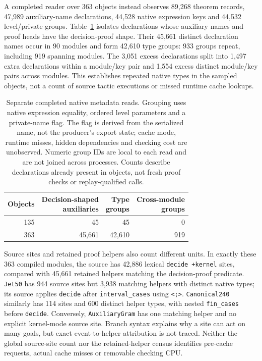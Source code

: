 \documentclass[10pt,twocolumn]{article}
\begin{document}
A completed reader over 363 objects instead observes 89,268 theorem records,
47,989 auxiliary-name declarations, 44,528 native expression keys and 44,532
level/private groups. Table~\ref{tab:native-type-keys} isolates declarations
whose auxiliary names and proof heads have the decision-proof shape.
Their 45,661 distinct declaration names occur in 90 modules and form 42,610
type groups: 933 groups repeat, including 919 spanning modules.
The 3,051 excess declarations split into 1,497 extra declarations within
a module/key pair and 1,554 excess distinct module/key pairs across modules.
This establishes repeated native types in the sampled objects, not a count
of source tactic executions or missed runtime cache lookups.

\begin{table}[t]
\centering
\small
\setlength{\tabcolsep}{4pt}
\begin{tabular}{rrrr}
\toprule
Objects & \shortstack{Decision-shaped\\auxiliaries} &
\shortstack{Type\\groups} & \shortstack{Cross-module\\groups} \\
\midrule
135 & 45 & 45 & 0 \\
363 & 45,661 & 42,610 & 919 \\
\bottomrule
\end{tabular}
\caption{Separate completed native metadata reads. Grouping uses native
expression equality, ordered level parameters and a private-name flag.
The flag is derived from the serialized name, not the producer's export state;
cache mode, runtime misses, hidden dependencies and checking cost are unobserved.
Numeric group IDs are local to each read and are not joined across processes.
Counts describe declarations already present in objects, not fresh proof checks
or replay-qualified calls.}
\label{tab:native-type-keys}
\end{table}

Source sites and retained proof helpers also count different units.
In exactly these 363 compiled modules, the source has 42,886 lexical
\texttt{decide +kernel} sites, compared with 45,661 retained helpers matching
the decision-proof predicate. \texttt{Jet50} has 944 source sites but 3,938
matching helpers with distinct native types; its source applies
\texttt{decide} after \texttt{interval\_cases} using \texttt{<;>}.
\texttt{Canonical240} similarly has 114 sites and 600 distinct helper types,
with nested \texttt{fin\_cases} before \texttt{decide}.
Conversely, \texttt{AuxiliaryGram} has one matching helper and no explicit
kernel-mode source site. Branch syntax explains why a site can act on many
goals, but exact event-to-helper attribution is not traced.
Neither the global source-site count nor the retained-helper census
identifies pre-cache requests, actual cache misses or removable checking CPU.
\end{document}
